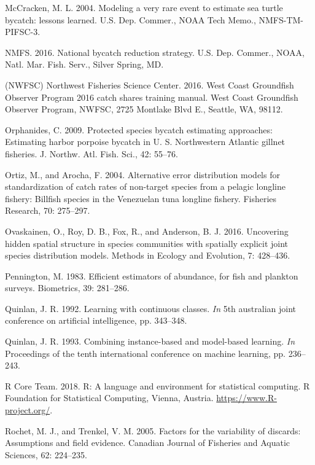 \documentclass[]{article}
\begin{document}
\hypertarget{ref-mccracken2004}{}
McCracken, M. L. 2004. Modeling a very rare event to estimate sea turtle
bycatch: lessons learned. U.S. Dep. Commer., NOAA Tech Memo.,
NMFS-TM-PIFSC-3.

\hypertarget{ref-nmfs2016bycatch}{}
NMFS. 2016. National bycatch reduction strategy. U.S. Dep. Commer.,
NOAA, Natl. Mar. Fish. Serv., Silver Spring, MD.

\hypertarget{ref-nwfsc2016}{}
(NWFSC) Northwest Fisheries Science Center. 2016. West Coast Groundfish
Observer Program 2016 catch shares training manual. West Coast
Groundfish Observer Program, NWFSC, 2725 Montlake Blvd E., Seattle, WA,
98112.

\hypertarget{ref-orphanides2009}{}
Orphanides, C. 2009. Protected species bycatch estimating approaches:
Estimating harbor porpoise bycatch in U. S. Northwestern Atlantic
gillnet fisheries. J. Northw. Atl. Fish. Sci., 42: 55--76.

\hypertarget{ref-ortiz2004}{}
Ortiz, M., and Arocha, F. 2004. Alternative error distribution models
for standardization of catch rates of non-target species from a pelagic
longline fishery: Billfish species in the Venezuelan tuna longline
fishery. Fisheries Research, 70: 275--297.

\hypertarget{ref-ovaskainen2016}{}
Ovaskainen, O., Roy, D. B., Fox, R., and Anderson, B. J. 2016.
Uncovering hidden spatial structure in species communities with
spatially explicit joint species distribution models. Methods in Ecology
and Evolution, 7: 428--436.

\hypertarget{ref-pennington1983}{}
Pennington, M. 1983. Efficient estimators of abundance, for fish and
plankton surveys. Biometrics, 39: 281--286.

\hypertarget{ref-quinlan1992}{}
Quinlan, J. R. 1992. Learning with continuous classes. \emph{In} 5th
australian joint conference on artificial intelligence, pp. 343--348.

\hypertarget{ref-quinlan1993}{}
Quinlan, J. R. 1993. Combining instance-based and model-based learning.
\emph{In} Proceedings of the tenth international conference on machine
learning, pp. 236--243.

\hypertarget{ref-rcoreteam2018}{}
R Core Team. 2018. R: A language and environment for statistical
computing. R Foundation for Statistical Computing, Vienna, Austria.
\url{https://www.R-project.org/}.

\hypertarget{ref-rochet2005}{}
Rochet, M. J., and Trenkel, V. M. 2005. Factors for the variability of
discards: Assumptions and field evidence. Canadian Journal of Fisheries
and Aquatic Sciences, 62: 224--235.
\end{document}
